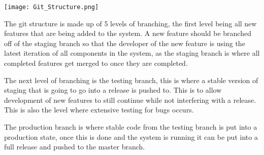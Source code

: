 \documentclass[12pt]{report}
\begin{document}
\texttt{[image: Git\_Structure.png]}

\begin{flushleft}

The git structure is made up of 5 levels of branching, the first level being all new features that are being added to the system. A new feature should be branched off of the staging branch so that the developer of the new feature is using the latest iteration of all components in the system, as the staging branch is where all completed features get merged to once they are completed.

\end{flushleft}

\begin{flushleft}

The next level of branching is the testing branch, this is where a stable version of staging that is going to go into a release is pushed to. This is to allow development of new features to still continue while not interfering with a release. This is also the level where extensive testing for bugs occurs. 

\end{flushleft}

\begin{flushleft}

The production branch is where stable code from the testing branch is put into a production state, once this is done and the system is running it can be put into a full release and pushed to the master branch.

\end{flushleft}
\end{document}
